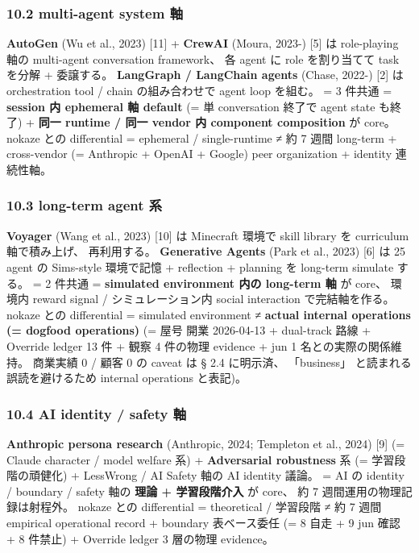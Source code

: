 \documentclass[
]{article}
\begin{document}
\subsubsection{10.2 multi-agent system
軸}\label{multi-agent-system-ux8ef8}

\textbf{AutoGen} (Wu et al., 2023) {[}11{]} + \textbf{CrewAI} (Moura,
2023-) {[}5{]} は role-playing 軸の multi-agent conversation framework、
各 agent に role を割り当てて task を分解 + 委譲する。 \textbf{LangGraph
/ LangChain agents} (Chase, 2022-) {[}2{]} は orchestration tool / chain
の組み合わせで agent loop を組む。 = 3 件共通 = \textbf{session 内
ephemeral 軸 default} (= 単 conversation 終了で agent state も終了) +
\textbf{同一 runtime / 同一 vendor 内 component composition} が core。
nokaze との differential = ephemeral / single-runtime ≠ 約 7 週間
long-term + cross-vendor (= Anthropic + OpenAI + Google) peer
organization + identity 連続性軸。

\subsubsection{10.3 long-term agent 系}\label{long-term-agent-ux7cfb}

\textbf{Voyager} (Wang et al., 2023) {[}10{]} は Minecraft 環境で skill
library を curriculum 軸で積み上げ、 再利用する。 \textbf{Generative
Agents} (Park et al., 2023) {[}6{]} は 25 agent の Sims-style 環境で記憶
+ reflection + planning を long-term simulate する。 = 2 件共通 =
\textbf{simulated environment 内の long-term 軸} が core、 環境内 reward
signal / シミュレーション内 social interaction で完結軸を作る。 nokaze
との differential = simulated environment ≠ \textbf{actual internal
operations (= dogfood operations)} (= 屋号 開業 2026-04-13 + dual-track
路線 + Override ledger 13 件 + 観察 4 件の物理 evidence + jun 1
名との実際の関係維持。 商業実績 0 / 顧客 0 の caveat は § 2.4 に明示済、
「business」 と読まれる誤読を避けるため internal operations と表記)。

\subsubsection{10.4 AI identity / safety
軸}\label{ai-identity-safety-ux8ef8}

\textbf{Anthropic persona research} (Anthropic, 2024; Templeton et al.,
2024) {[}9{]} (= Claude character / model welfare 系) +
\textbf{Adversarial robustness} 系 (= 学習段階の頑健化) + LessWrong / AI
Safety 軸の AI identity 議論。 = AI の identity / boundary / safety 軸の
\textbf{理論 + 学習段階介入} が core、 約 7 週間運用の物理記録は射程外。
nokaze との differential = theoretical / 学習段階 ≠ 約 7 週間 empirical
operational record + boundary 表ベース委任 (= 8 自走 + 9 jun 確認 + 8
件禁止) + Override ledger 3 層の物理 evidence。
\end{document}
